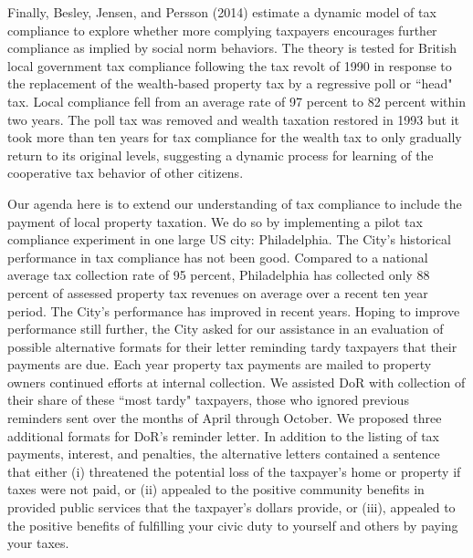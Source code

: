 \documentclass[12pt,titlepage]{article}
\begin{document}
Finally, Besley, Jensen, and Persson (2014) estimate a dynamic model
of tax compliance to explore whether more complying taxpayers
encourages further compliance as implied by social norm behaviors.
The theory is tested for British local government tax compliance
following the tax revolt of 1990 in response to the replacement of the
wealth-based property tax by a regressive poll or ``head" tax.  Local
compliance fell from an average rate of 97 percent to 82 percent
within two years.  The poll tax was removed and wealth taxation
restored in 1993 but it took more than ten years for tax compliance
for the wealth tax to only gradually return to its original levels,
suggesting a dynamic process for learning of the cooperative tax
behavior of other citizens.

Our agenda here is to extend our understanding of tax compliance to
include the payment of local property taxation.  We do so by
implementing a pilot tax compliance experiment in one large US city:
Philadelphia.  The City's historical performance in tax compliance has
not been good.  Compared to a national average tax collection rate of
95 percent, Philadelphia has collected only 88 percent of assessed
property tax revenues on average over a recent ten year period.  The
City's performance has improved in recent years.  Hoping to improve
performance still further, the City asked for our assistance in an
evaluation of possible alternative formats for their letter reminding
tardy taxpayers that their payments are due.  Each year property tax
payments are mailed to property owners continued efforts at internal
collection.  We assisted DoR with collection of their share of these
``most tardy" taxpayers, those who ignored previous reminders sent over
the months of April through October.  We proposed three additional
formats for DoR's reminder letter.  In addition to the listing of tax
payments, interest, and penalties, the alternative letters contained a
sentence that either (i) threatened the potential loss of the
taxpayer's home or property if taxes were not paid, or (ii) appealed
to the positive community benefits in provided public services that
the taxpayer's dollars provide, or (iii), appealed to the positive
benefits of fulfilling your civic duty to yourself and others by
paying your taxes.
\end{document}
